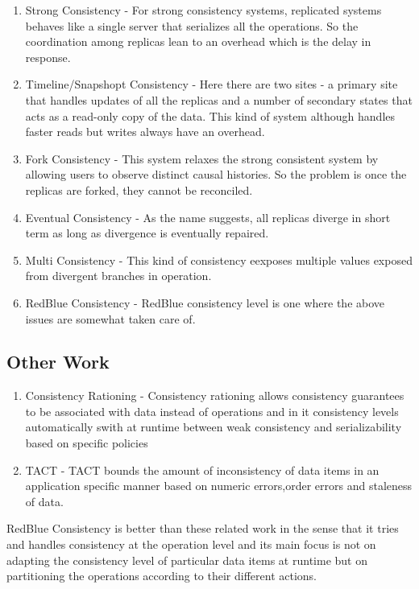 \documentclass[12pt]{article}
\theoremstyle{plain}
\theoremstyle{definition}
\theoremstyle{remark}
\begin{document}
\begin{enumerate}
\item Strong Consistency - For strong consistency systems, replicated systems behaves like a single server that serializes all the operations. So the coordination among replicas lean to an overhead which is the delay in response.
\item Timeline/Snapshopt Consistency - Here there are two sites - a primary site that handles updates of all the replicas and a number of secondary states that acts as a read-only copy of the data. This kind of system although handles faster reads but writes always have an overhead.
\item Fork Consistency - This system relaxes the strong consistent system by allowing users to observe distinct causal histories. So the problem is once the replicas are forked, they cannot be reconciled.
\item Eventual Consistency - As the name suggests, all replicas diverge in short term as long as divergence is eventually repaired.
\item Multi Consistency - This kind of consistency eexposes multiple values exposed from divergent branches in operation.
\item RedBlue Consistency -  RedBlue consistency level is one where the above issues are somewhat taken care of. 
\end{enumerate}

\subsection*{Other Work}

\begin{enumerate}
\item Consistency Rationing - Consistency rationing allows consistency guarantees to be associated with data instead of operations and in it consistency levels automatically swith at runtime between weak consistency and serializability based on specific policies
\item TACT - TACT bounds the amount of inconsistency of data items in an application specific manner based on numeric errors,order errors and staleness of data.
\end{enumerate}

RedBlue Consistency is better than these related work in the sense that it tries and handles consistency at the operation level and its main focus is not on adapting the consistency level of particular data items at runtime but on partitioning the operations according to their different actions.
\end{document}

